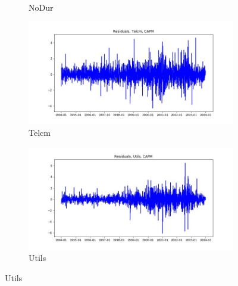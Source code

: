 \documentclass{article}
\begin{document}
\begin{figure}
\begin{subfigure}[b]{0.5\textwidth}
    \caption{NoDur}
    \label{fig:2}
  \end{subfigure}
  \begin{subfigure}[b]{0.5\textwidth}
    \centering
    \includegraphics[width=\textwidth]{Telcm/resid_ts_CAPM.jpg}
    \caption{Telcm}
    \label{fig:2}
  \end{subfigure}
  \begin{subfigure}[b]{0.5\textwidth}
    \centering
    \includegraphics[width=\textwidth]{Utils/resid_ts_CAPM.jpg}
    \caption{Utils}
    \label{fig:2}
  \end{subfigure}
\end{figure}

\newpage
\end{document}
